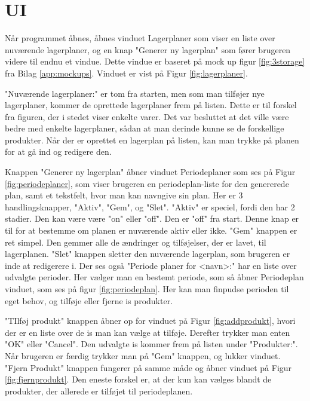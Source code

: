 \section{UI} 
Når programmet åbnes, åbnes vinduet Lagerplaner som viser en liste over nuværende lagerplaner, og en knap "Generer ny lagerplan" som fører brugeren videre til endnu et vindue. Dette vindue er baseret på mock up figur \ref{fig:3storage} fra Bilag \ref{app:mockups}. Vinduet er vist på Figur \ref{fig:lagerplaner}. 

"Nuværende lagerplaner:" er tom fra starten, men som man tilføjer nye lagerplaner, kommer de oprettede lagerplaner frem på listen. Dette er til forskel fra figuren, der i stedet viser enkelte varer. Det var besluttet at det ville være bedre med enkelte lagerplaner, sådan at man derinde kunne se de forskellige produkter. 
Når der er oprettet en lagerplan på listen, kan man trykke på planen for at gå ind og redigere den. 

Knappen "Generer ny lagerplan" åbner vinduet Periodeplaner som ses på Figur \ref{fig:periodeplaner}, som viser brugeren en periodeplan-liste for den genererede plan, samt et tekstfelt, hvor man kan navngive sin plan. Her er 3 handlingsknapper, "Aktiv", "Gem", og "Slet". 
"Aktiv" er speciel, fordi den har 2 stadier. Den kan være være "on" eller "off". Den er "off" fra start. Denne knap er til for at bestemme om planen er nuværende aktiv eller ikke. "Gem" knappen er ret simpel. Den gemmer alle de ændringer og tilføjelser, der er lavet, til lagerplanen. "Slet" knappen sletter den nuværende lagerplan, som brugeren er inde at redigerere i. 
Der ses også "Periode planer for <navn>:" har en liste over udvalgte perioder. Her vælger man en bestemt periode, som så åbner Periodeplan vinduet, som ses på figur \ref{fig:periodeplan}. Her kan man finpudse perioden til eget behov, og tilføje eller fjerne is produkter.   

"TIlføj produkt" knappen åbner op for vinduet på Figur \ref{fig:addprodukt}, hvori der er en liste over de is man kan vælge at tilføje. Derefter trykker man enten "OK" eller "Cancel". Den udvalgte is kommer frem på listen under "Produkter:". Når brugeren er færdig trykker man på "Gem" knappen, og lukker vinduet. 
"Fjern Produkt" knappen fungerer på samme måde og åbner vinduet på Figur \ref{fig:fjernprodukt}. Den eneste forskel er, at der kun kan vælges blandt de produkter, der allerede er tilføjet til periodeplanen.

